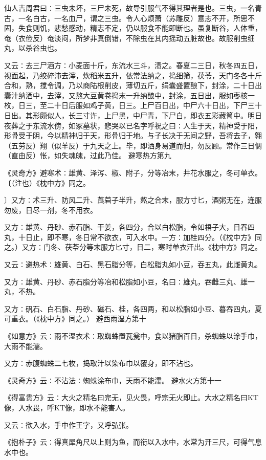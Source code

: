 \documentclass[a4paper,12pt,UTF8,twoside]{ctexbook}
\begin{document}
仙人吉周君曰∶三虫未坏，三尸未死，故导引服气不得其理者是也。三虫，一名青古，一名白古，一名血尸，谓之三虫。令人心烦萧（苏雕反）意志不开，所思不固，失食则饥，悲愁感动，精志不定，仍以服食不能即断也。虽复断谷，人体重，奄（衣俭反）奄淡闷，所梦非真倒错，不除虫在其内摇动五脏故也。故服削虫细丸，以杀谷虫也。

又云∶去三尸酒方∶小麦面十斤，东流水三斗，渍之。春夏二三日，秋冬四五日，视面起，乃绞碎沛去滓，炊稻米五升，依常法纳之，捣细筛，茯苓，天门冬各十斤合和，熟，搅令调，乃以商陆根削皮，薄切五斤，绢囊盛置酿下，封涂，二十日出囊汁纳酒中，去滓，又熬大豆黄卷捣末一升纳酿中，封涂，五日出，服如枣核一枚，日三，至二十日后服如鸡子黄，日三。上尸百日出，中尸六十日出，下尸三十日出。其形颇似人，长三寸许，上尸黑，中尸青，下尸白，即衣五彩藏笥中。明日夜葬之于东流水傍，如冢墓状，悲哭以已名字呼祝之曰∶人生于天，精神受于阳，形骨受于阴，今以精神归于天，形骨归于地。与子长决于无间之野，吾将去子，翱（五劳反）翔（似羊反）于九天之上。毕，即洒身易道而归，勿反顾。常作三日惆（直由反）怅，如失魂魄，过此乃佳。
避寒热方第九

《灵奇方》避寒术∶雄黄、泽泻、椒、附子，分等冶末，井花水服之，冬可单衣。〔（注也）《枕中方》同之。

〕又方∶术三升、防风二升、莨菪子半升，熬之合末，服方寸匕，酒粥无在，连服勿废，日尽一剂，冬不用衣。

又方∶雄黄、丹砂、赤石脂、干姜，各四分，合以白松脂，令如梧子大，日吞四丸，十日止，即不寒，冬日常不欲衣，可入水中。一方∶加桂四分。（《枕中方》同之。）又方∶门冬、茯苓分等末服方匕寸，日二，寒时单衣汗出。《枕中方》同之。

又云∶避热术∶雄黄、白石、黑石脂分等，白松脂丸如小豆，吞五丸，此雌黄丸。

又方∶雄黄、丹砂、赤石脂分等冶和松脂如小豆，名曰∶雄丸，吞雌三丸、雄一丸，不热。

又方∶矾石、白石脂、丹砂、磁石、桂，各四两，和以松脂如小豆、暮吞四丸，夏可重衣。（《枕中方》同之。）
避西雨湿方第十

《如意方》云∶雨不湿衣术∶取蜘蛛置瓦瓮中，食以猪脂百日，杀蜘蛛以涂手巾，大雨不能濡。

又方∶赤腹蜘蛛二七枚，捣取汁以染布巾以覆身，即不沾也。

《灵奇方》云∶不沾法∶蜘蛛涂布巾，天雨不能濡。
避水火方第十一

《得富贵方》云∶大火之精名曰完无，见火畏，呼宗无火即止。大水之精名曰KT像，入水畏，呼KT像，即水不能害人。

又云∶欲入水，手中作王字，又呼弘张。

《抱朴子》云∶得真犀角尺以上则为鱼，而衔以入水中，水常为开三尺，可得气息水中也。
\end{document}
